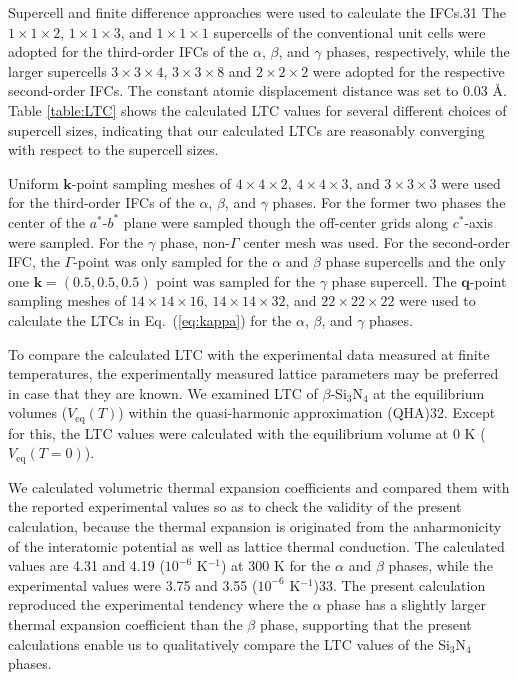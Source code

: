 \documentclass[twocolumn,amsmath,amssymb,a4paper,prb,superscriptaddress,floatfix]{revtex4-1}
\begin{document}
Supercell and finite difference approaches were used to calculate the
IFCs.31 The $1\times 1\times2$, $1\times 1\times3$, and $1\times
1\times1$ supercells of the conventional unit cells were adopted for the
third-order IFCs of the $\alpha$, $\beta$, and $\gamma$ phases,
respectively, while the larger supercells $3\times 3\times4$, $3\times
3\times8$ and $2\times 2\times2$ were adopted for the respective
second-order IFCs. The constant atomic displacement distance was set to
0.03 \AA. Table \ref{table:LTC} shows the calculated LTC values for
several different choices of supercell sizes, indicating that our
calculated LTCs are reasonably converging with respect to the supercell
sizes.

Uniform $\mathbf{k}$-point sampling meshes of $4\times 4\times 2$,
$4\times 4\times 3$, and $3\times 3\times 3$ were used for the
third-order IFCs of the $\alpha$, $\beta$, and $\gamma$ phases. For the
former two phases the center of the $a^*$-$b^*$ plane were sampled
though the off-center grids along $c^*$-axis were sampled. For the
$\gamma$ phase, non-$\Gamma$ center mesh was used. For the second-order
IFC, the $\Gamma$-point was only sampled for the $\alpha$ and $\beta$
phase supercells and the only one $\mathbf{k}=(0.5, 0.5, 0.5)$ point was
sampled for the $\gamma$ phase supercell. The $\mathbf{q}$-point
sampling meshes of $14\times 14\times 16$, $14\times 14\times 32$, and
$22\times 22\times 22$ were used to calculate the LTCs in Eq.~(\ref{eq:kappa})
 for
the $\alpha$, $\beta$, and $\gamma$ phases.

To compare the calculated LTC with the experimental data measured at
finite temperatures, the experimentally measured lattice parameters may 
be preferred in case that they are known. We examined LTC of
$\beta$-Si$_3$N$_4$ at the equilibrium volumes ($V_\text{eq}(T)$) within the
quasi-harmonic approximation (QHA)32. Except for this, the LTC values
were calculated with the equilibrium volume at 0 K ($V_\text{eq}(T=0)$).

We calculated volumetric thermal expansion coefficients and compared
them with the reported experimental values so as to check the validity
of the present calculation, because the thermal expansion is originated
from the anharmonicity of the interatomic potential as well as lattice
thermal conduction. The calculated values are 4.31 and 4.19 ($10^{-6}$
K$^{-1}$) at 300 K for the $\alpha$ and $\beta$ phases, while the
experimental values were 3.75 and 3.55 ($10^{-6}$ K$^{-1}$)33. The present
calculation reproduced the experimental tendency where the $\alpha$
phase has a slightly larger thermal expansion coefficient than the
$\beta$ phase, supporting that the present calculations enable us to
qualitatively compare the LTC values of the Si$_3$N$_4$ phases.
\end{document}
